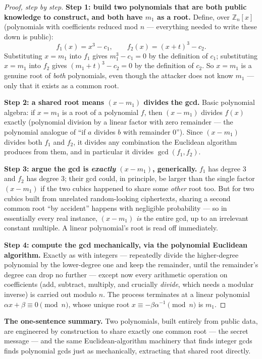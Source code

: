 \begin{proof}[Proof, step by step]
\textbf{Step 1: build two polynomials that are both public knowledge to construct, and both have $m_1$ as a root.} Define, over $\mathbb{Z}_n[x]$ (polynomials with coefficients reduced mod $n$ — everything needed to write these down is public):
\[
f_1(x) = x^3 - c_1, \qquad f_2(x) = (x+t)^3 - c_2.
\]
Substituting $x=m_1$ into $f_1$ gives $m_1^3-c_1=0$ by the definition of $c_1$; substituting $x=m_1$ into $f_2$ gives $(m_1+t)^3-c_2=0$ by the definition of $c_2$. So $x=m_1$ is a genuine root of \emph{both} polynomials, even though the attacker does not know $m_1$ — only that it exists as a common root.

\textbf{Step 2: a shared root means $(x-m_1)$ divides the gcd.} Basic polynomial algebra: if $x=m_1$ is a root of a polynomial $f$, then $(x-m_1)$ divides $f(x)$ exactly (polynomial division by a linear factor with zero remainder — the polynomial analogue of ``if $a$ divides $b$ with remainder $0$''). Since $(x-m_1)$ divides both $f_1$ and $f_2$, it divides any combination the Euclidean algorithm produces from them, and in particular it divides $\gcd(f_1,f_2)$.

\textbf{Step 3: argue the gcd is \emph{exactly} $(x-m_1)$, generically.} $f_1$ has degree $3$ and $f_2$ has degree $3$; their gcd could, in principle, be larger than the single factor $(x-m_1)$ if the two cubics happened to share some \emph{other} root too. But for two cubics built from unrelated random-looking ciphertexts, sharing a second common root ``by accident'' happens with negligible probability — so in essentially every real instance, $(x-m_1)$ \emph{is} the entire gcd, up to an irrelevant constant multiple. A linear polynomial's root is read off immediately.

\textbf{Step 4: compute the gcd mechanically, via the polynomial Euclidean algorithm.} Exactly as with integers — repeatedly divide the higher-degree polynomial by the lower-degree one and keep the remainder, until the remainder's degree can drop no further — except now every arithmetic operation on coefficients (add, subtract, multiply, and crucially \emph{divide}, which needs a modular inverse) is carried out modulo $n$. The process terminates at a linear polynomial $\alpha x+\beta\equiv0\pmod n$, whose unique root $x\equiv-\beta\alpha^{-1}\pmod n$ is $m_1$.
\end{proof}

\medskip\noindent\textbf{The one-sentence summary.} Two polynomials, built entirely from public data, are engineered by construction to share exactly one common root — the secret message — and the same Euclidean-algorithm machinery that finds integer gcds finds polynomial gcds just as mechanically, extracting that shared root directly.

